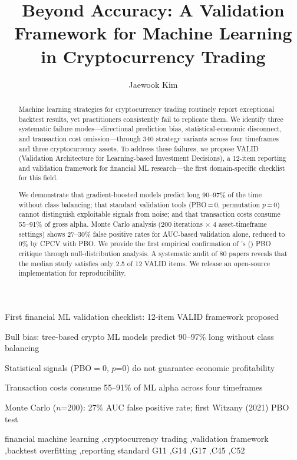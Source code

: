 \documentclass[preprint,12pt,authoryear]{elsarticle}
\begin{document}
\begin{frontmatter}

\title{Beyond Accuracy: A Validation Framework for Machine Learning in Cryptocurrency Trading}

\author{Jaewook Kim}
\address{Independent Researcher, Uijeongbu, Republic of Korea; B.S.\ Industrial Engineering, UNIST; Professional Engineer (Engineers Australia)}

\begin{highlights}
\item First financial ML validation checklist: 12-item VALID framework proposed
\item Bull bias: tree-based crypto ML models predict 90--97\% long without class balancing
\item Statistical signals (PBO$=$0, $p$=0) do not guarantee economic profitability
\item Transaction costs consume 55--91\% of ML alpha across four timeframes
\item Monte Carlo ($n$=200): 27\% AUC false positive rate; first Witzany (2021) PBO test
\end{highlights}

\begin{abstract}
Machine learning strategies for cryptocurrency trading routinely report exceptional backtest results, yet practitioners consistently fail to replicate them. We identify three systematic failure modes---directional prediction bias, statistical-economic disconnect, and transaction cost omission---through 340 strategy variants across four timeframes and three cryptocurrency assets. To address these failures, we propose VALID (Validation Architecture for Learning-based Investment Decisions), a 12-item reporting and validation framework for financial ML research---the first domain-specific checklist for this field.

We demonstrate that gradient-boosted models predict long 90--97\% of the time without class balancing; that standard validation tools (PBO\,=\,0, permutation $p$\,=\,0) cannot distinguish exploitable signals from noise; and that transaction costs consume 55--91\% of gross alpha. Monte Carlo analysis (200 iterations $\times$ 4 asset-timeframe settings) shows 27--30\% false positive rates for AUC-based validation alone, reduced to 0\% by CPCV with PBO. We provide the first empirical confirmation of \citeauthor{witzany2021bayesian}'s (\citeyear{witzany2021bayesian}) PBO critique through null-distribution analysis. A systematic audit of 80 papers reveals that the median study satisfies only 2.5 of 12 VALID items. We release an open-source implementation for reproducibility.
\end{abstract}

\begin{keyword}
financial machine learning \sep cryptocurrency trading \sep validation framework \sep backtest overfitting \sep reporting standard
\JEL G11 \sep G14 \sep G17 \sep C45 \sep C52
\end{keyword}

\end{frontmatter}
\end{document}

